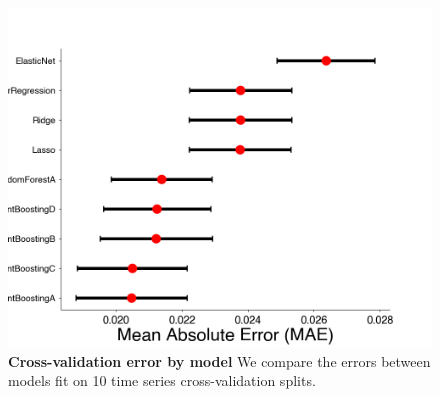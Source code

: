 \documentclass[11pt,oneside,letterpaper]{article}
\begin{document}
\begin{figure}[t!]
    \centering
    \includegraphics[width=1.0\textwidth=0.01]{./supplementary_figures/growth-rate-prediction-model-comparison.png}
    \caption{
      \textbf{Cross-validation error by model}
      We compare the errors between models fit on 10 time series cross-validation splits.
    }
    \label{fig:growth_rate_predictions_model_comparison}
\end{figure}
\end{document}
